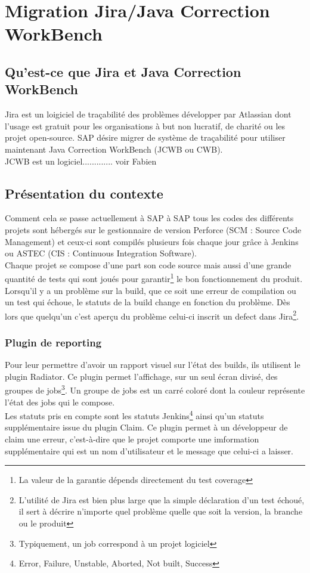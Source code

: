 \chapter{Migration Jira/Java Correction WorkBench}

\section{Qu'est-ce que Jira et Java Correction WorkBench}
Jira est un loigiciel de tra\c{c}abilit\'{e} des probl\`{e}mes d\'{e}velopper par Atlassian dont l'usage est gratuit pour les organisations \`{a} but non lucratif, de charit\'{e} ou les projet open-source. SAP désire migrer de système de traçabilité pour utiliser maintenant Java Correction WorkBench (JCWB ou CWB).\\

JCWB est un logiciel............. voir Fabien



\section{Pr\'{e}sentation du contexte}

Comment cela se passe actuellement \`{a} SAP
à SAP tous les codes des différents projets sont hébergés sur le gestionnaire de version Perforce (SCM : Source Code Management)
et ceux-ci sont compilés plusieurs fois chaque jour grâce à Jenkins ou ASTEC (CIS : Continuous Integration Software).\\
Chaque projet se compose d'une part son code source mais aussi d'une grande quantité de tests qui sont joués pour garantir\footnote{La valeur de la garantie dépends directement du test coverage} le bon fonctionnement du produit. Lorsqu'il y a un problème sur la build, que ce soit une erreur de compilation ou un test qui échoue, le statuts de la build change en fonction du problème. Dès lors que quelqu'un c'est aperçu du problème celui-ci inscrit un defect dans Jira\footnote{L'utilité de Jira est bien plus large que la simple déclaration d'un test échoué, il sert à décrire n'importe quel problème quelle que soit la version, la branche ou le produit}.\\


\subsection{Plugin de reporting}
Pour leur permettre d'avoir un rapport visuel sur l'état des builds, ils utilisent le plugin Radiator. Ce plugin permet l'affichage, sur un seul écran divisé, des groupes de jobs\footnote{Typiquement, un job correspond à un projet logiciel}. Un groupe de jobs est un carré coloré dont la couleur représente l'état des jobs qui le compose.\\
Les statuts pris en compte sont les statuts Jenkins\footnote{Error, Failure, Unstable, Aborted, Not built, Success} ainsi qu'un statuts supplémentaire issue du plugin Claim. Ce plugin permet à un développeur de claim une erreur, c'est-à-dire que le projet comporte une imformation supplémentaire qui est un nom d'utilisateur et le message que celui-ci a laisser.


